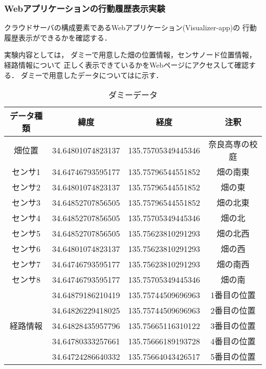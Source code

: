 \documentclass[12pt]{honka_v1}
\begin{document}
\subsubsection{Webアプリケーションの行動履歴表示実験}
クラウドサーバの構成要素であるWebアプリケーション(Visualizer-app)の
行動履歴表示ができるかを確認する．

実験内容としては，
ダミーで用意した畑の位置情報，センサノード位置情報，経路情報について
正しく表示できているかをWebページにアクセスして確認する．
ダミーで用意したデータについてはに示す．
\begin{table}[htbp]
    \caption{ダミーデータ}
    \label{tb:damy-history}
    \centering
    \begin{tabular}{c|cc|c}\hline
        データ種類 & 緯度 & 経度 & 注釈\\
        \hline
        畑位置 & 34.64801074823137 & 135.75705349445346 & 奈良高専の校庭\\
        \hline
        センサ1 & 34.64746793595177 & 135.75796544551852 & 畑の南東\\
        センサ2 & 34.64801074823137 & 135.75796544551852 & 畑の東\\
        センサ3 & 34.64852707856505 & 135.75796544551852 & 畑の北東\\
        センサ4 & 34.64852707856505 & 135.75705349445346 & 畑の北\\
        センサ5 & 34.64852707856505 & 135.75623810291293 & 畑の北西\\
        センサ6 & 34.64801074823137 & 135.75623810291293 & 畑の西\\
        センサ7 & 34.64746793595177 & 135.75623810291293 & 畑の南西\\
        センサ8 & 34.64746793595177 & 135.75705349445346 & 畑の南\\
        \hline
        \multirow{5}{*}{経路情報}
        & 34.64879186210419 & 135.75744509696963 & 1番目の位置 \\
        & 34.64826229418025 & 135.75744509696963 & 2番目の位置 \\
        & 34.64828435957796 & 135.75665116310122 & 3番目の位置 \\
        & 34.64780333257661 & 135.75666189193728 & 4番目の位置 \\
        & 34.64724286640332 & 135.75664043426517 & 5番目の位置 \\
        \hline
    \end{tabular}
\end{table}
\end{document}

